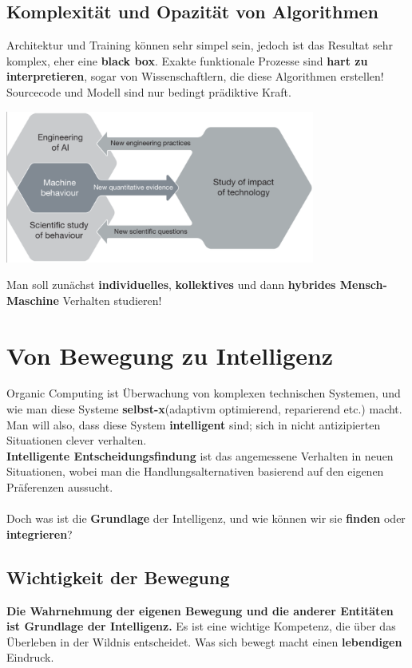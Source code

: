 \documentclass[a4paper]{article}
\begin{document}
\subsection{Komplexität und Opazität von Algorithmen}
Architektur und Training können sehr simpel sein, jedoch ist das Resultat sehr komplex, eher eine \textbf{black box}. Exakte funktionale Prozesse sind \textbf{hart zu interpretieren}, sogar von Wissenschaftlern, die diese Algorithmen erstellen! Sourcecode und Modell sind nur bedingt prädiktive Kraft.
\begin{center}
	\includegraphics[height = 5cm]{AI.png}
\end{center}
Man soll zunächst \textbf{individuelles}, \textbf{kollektives} und dann \textbf{hybrides Mensch-Maschine} Verhalten studieren!
\newpage
\section{Von Bewegung zu Intelligenz}
Organic Computing ist Überwachung von komplexen technischen Systemen, und wie man diese Systeme \textbf{selbst-x}(adaptivm optimierend, reparierend etc.) macht. Man will also, dass diese System \textbf{intelligent} sind; sich in nicht antizipierten Situationen clever verhalten.\\
\textbf{Intelligente Entscheidungsfindung} ist das angemessene Verhalten in neuen Situationen, wobei man die Handlungsalternativen basierend auf den eigenen Präferenzen aussucht. \\
\\
Doch was ist die \textbf{Grundlage} der Intelligenz, und wie können wir sie \textbf{finden} oder \textbf{integrieren}?
\subsection{Wichtigkeit der Bewegung}
\textbf{Die Wahrnehmung der eigenen Bewegung und die anderer Entitäten ist Grundlage der Intelligenz.} Es ist eine wichtige Kompetenz, die über das Überleben in der Wildnis entscheidet. Was sich bewegt macht einen \textbf{lebendigen} Eindruck.\\
\end{document}
